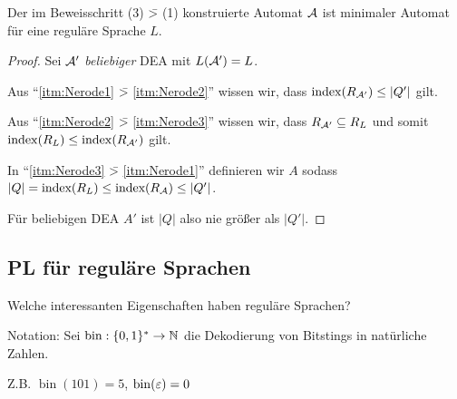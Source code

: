 %
\setcounter{Korollar}{4}
\begin{Korollar}\label{kor:2.minAutomat}
        Der im Beweisschritt (3) \=> (1) konstruierte Automat $\mathcal{A}$ ist minimaler Automat für eine reguläre Sprache $L$.
\end{Korollar}
\begin{proof}
        Sei $\mathcal{A}'$ \emph{beliebiger} \ac{DEA} mit $L(\mathcal{A}')=L$.
        
        Aus "`\ref{itm:Nerode1} {\=>} \ref{itm:Nerode2}"' wissen wir, dass $\operatorname{index}(R_{\mathcal{A}'})\leq |Q'|$ gilt.
        
        Aus "`\ref{itm:Nerode2} \=> \ref{itm:Nerode3}"' wissen wir, dass $R_{\mathcal{A}'}\subseteq R_L$ und somit $\operatorname{index}(R_L) \leq \operatorname{index}(R_{\mathcal{A}'})$ gilt.
        
        In "`\ref{itm:Nerode3} \=> \ref{itm:Nerode1}"' definieren wir $A$ sodass $|Q|=\text{index}(R_L) \leq \text{index}(R_{\mathcal{A}})\leq |Q'|$.
        
        Für beliebigen DEA $A'$ ist $|Q|$ also nie größer als $|Q'|$.
\end{proof}


\subsection{\acf{PL} für reguläre Sprachen} %
Welche interessanten Eigenschaften haben reguläre Sprachen?

Notation: Sei $\operatorname{bin}:\{0,1\}^*\rightarrow \mathbb{N}$ die Dekodierung von Bitstings in natürliche Zahlen.

Z.B. $\operatorname{bin}(101) = 5$, $\operatorname{bin}(\varepsilon) = 0$

